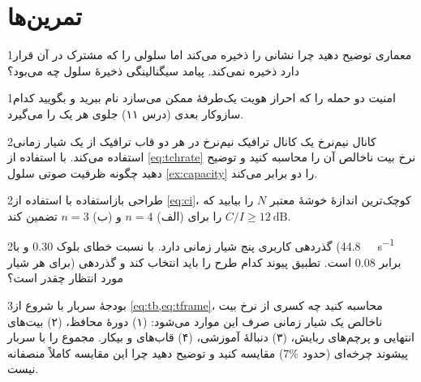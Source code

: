 \documentclass[11pt,a4paper]{article}
\begin{document}
\section{تمرین‌ها}\label{sec:exercises}

\begin{exercisebox}{1}{معماری}\label{exr:arch}
توضیح دهید چرا  نشانی  را ذخیره می‌کند اما سلولی را که مشترک در آن
قرار دارد ذخیره نمی‌کند. پیامد سیگنالینگی ذخیرهٔ سلول چه می‌بود؟
\end{exercisebox}

\begin{exercisebox}{1}{امنیت}\label{exr:sec}
دو حمله را که احراز هویت یک‌طرفهٔ  ممکن می‌سازد نام ببرید و بگویید کدام سازوکار
بعدی (درس ۱۱) جلوی هر یک را می‌گیرد.
\end{exercisebox}

\begin{exercisebox}{2}{کانال نیم‌نرخ}\label{exr:halfrate}
یک کانال ترافیک نیم‌نرخ در هر دو قاب ترافیک از یک شیار زمانی استفاده می‌کند. با استفاده
از \cref{eq:tchrate} نرخ بیت ناخالص آن را محاسبه کنید و توضیح دهید چگونه ظرفیت صوتی سلول
\cref{ex:capacity} را دو برابر می‌کند.
\end{exercisebox}

\begin{exercisebox}{2}{طراحی بازاستفاده}\label{exr:reuse}
با استفاده از \cref{eq:ci}، کوچک‌ترین اندازهٔ خوشهٔ معتبر $N$ را بیابید که
$C/I\ge\qty{12}{\dB}$ را برای (الف) $n=4$ و (ب) $n=3$ تضمین کند.
\end{exercisebox}

\begin{exercisebox}{2}{گذردهی }\label{exr:edge}
کاربری پنج شیار زمانی دارد. با  نسبت خطای بلوک 0.30 و با 
(\qty{44.8}{\kilo\bit\per\second} برای هر شیار) برابر 0.08 است. تطبیق پیوند کدام طرح را
باید انتخاب کند و گذردهی مورد انتظار چقدر است؟
\end{exercisebox}

\begin{exercisebox}{3}{بودجهٔ سربار}\label{exr:overhead}
با شروع از \cref{eq:tb,eq:tframe}، محاسبه کنید چه کسری از نرخ بیت ناخالص یک شیار زمانی
صرف این موارد می‌شود: (۱) دورهٔ محافظ، (۲) بیت‌های انتهایی و پرچم‌های ربایش، (۳) دنبالهٔ
آموزشی، (۴) قاب‌های  و بیکار. مجموع را با سربار پیشوند چرخه‌ای 
(حدود $7\%$) مقایسه کنید و توضیح دهید چرا این مقایسه کاملاً منصفانه نیست.
\end{exercisebox}
\end{document}
